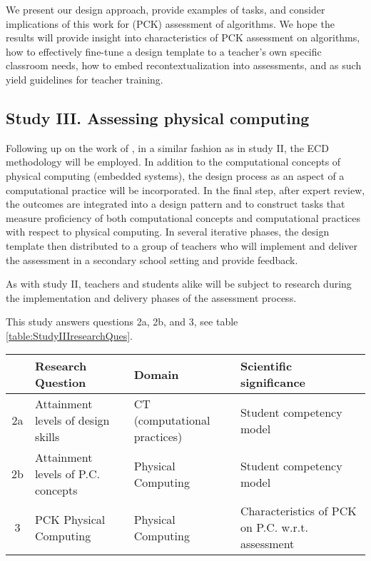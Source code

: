 We present our design approach, provide examples of tasks, and consider implications of this work for (PCK) assessment of algorithms.
We hope the results will provide insight into characteristics of PCK assessment on algorithms, how to effectively fine-tune a design template to a teacher's own specific classroom needs, how to embed recontextualization into assessments, and as such yield guidelines for teacher training.


\subsection{Study III. Assessing physical computing} %

Following up on the work of \cite{mareen2018PhysComp}, in a similar fashion as in study II, the ECD methodology will be employed. In addition to the computational concepts of physical computing (embedded systems), the design process as an aspect of a computational practice will be incorporated. In the final step, after expert review, the outcomes are integrated into a design pattern and to construct tasks that measure proficiency of both computational concepts and computational practices with respect to physical computing. In several iterative phases, the design template then distributed to a group of teachers who will implement and deliver the assessment in a secondary school setting and provide feedback.

As with study II, teachers and students alike will be subject to research during the implementation and delivery phases of the assessment process.



This study answers questions 2a, 2b, and 3, see table \ref{table:StudyIIIresearchQues}.


\begin{table*}
  \centering
\begin{tabular}{|c|p{70mm}|l|p{50mm}|}
   \hline
    &\textbf{Research Question} & \textbf{Domain} & \textbf{Scientific significance}\\
  \hline

  2a & Attainment levels of design skills & CT (computational practices) & Student competency model  \\ \hline
  2b & Attainment levels of P.C. concepts & Physical Computing & Student competency model\\ \hline
  3 & PCK Physical Computing & Physical Computing & Characteristics of PCK on P.C. w.r.t. assessment\\
  \hline
\end{tabular}
\caption{Overview study II.}\label{table:StudyIIIresearchQues}
\end{table*}


